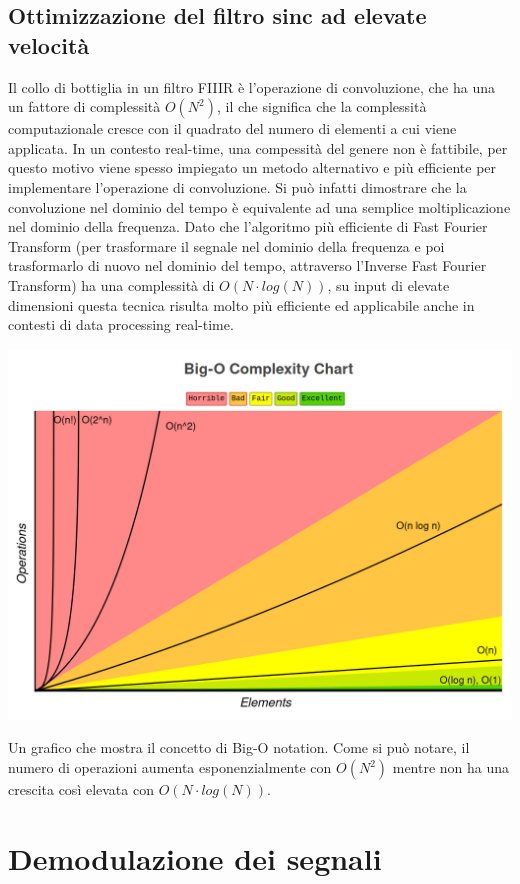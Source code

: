 \documentclass{article}
\begin{document}
\subsection{Ottimizzazione del filtro sinc ad elevate velocità}
Il collo di bottiglia in un filtro FIIIR è l'operazione di convoluzione, che ha una un fattore di complessità \cite{big_o} $O(N^2)$,
il che significa che la complessità computazionale cresce con il quadrato del numero di elementi a cui viene applicata. In un
contesto real-time, una compessità del genere non è fattibile, per questo motivo viene spesso impiegato un metodo alternativo e
più efficiente per implementare l'operazione di convoluzione. Si può infatti dimostrare che la convoluzione nel dominio del tempo
è equivalente ad una semplice moltiplicazione nel dominio della frequenza. Dato che l'algoritmo più efficiente di Fast Fourier
Transform (per trasformare il segnale nel dominio della frequenza e poi trasformarlo di nuovo nel dominio del tempo, attraverso
l'Inverse Fast Fourier Transform) ha una complessità di $O(N \cdot log (N))$, su input di elevate dimensioni questa tecnica risulta
molto più efficiente ed applicabile anche in contesti di data processing real-time.

\begin{center}
    \includegraphics[width=\textwidth]{big_o.png}
\end{center}
Un grafico che mostra il concetto di Big-O notation. Come si può notare, il numero di operazioni aumenta esponenzialmente
con $O(N^2)$ mentre non ha una crescita così elevata con $O(N \cdot log (N))$.

\section{Demodulazione dei segnali}
\end{document}
